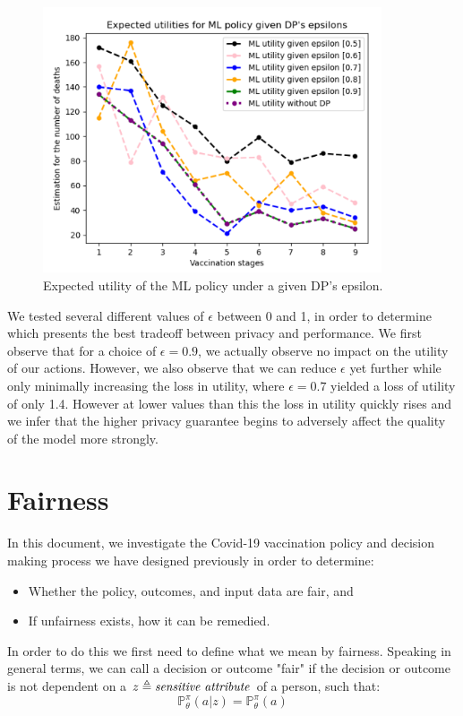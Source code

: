\documentclass{article}
\begin{document}
\begin{itemize}
\begin{figure}[H]
    \includegraphics[width=10cm]{pictures/epsilons.png}
    \centering
    \caption{Expected utility of the ML policy under a given DP's epsilon.}
    \label{fig: epsilons}
\end{figure}

We tested several different values of $\epsilon$ between 0 and 1, in order to determine which presents the best tradeoff between privacy and performance. We first observe that for a choice of $\epsilon = 0.9$, we actually observe no impact on the utility of our actions. However, we also observe that we can reduce $\epsilon$ yet further while only minimally increasing the loss in utility, where $\epsilon = 0.7$ yielded a loss of utility of only 1.4. However at lower values than this the loss in utility quickly rises and we infer that the higher privacy guarantee begins to adversely affect the quality of the model more strongly.
\end{itemize}

\section{Fairness}
\label{sec: Fairness}
In this document, we investigate the Covid-19 vaccination policy and decision making process we have designed previously in order to determine: 
\begin{itemize}
    \item Whether the policy, outcomes, and input data are fair, and 
    \item If unfairness exists, how it can be remedied. 
\end{itemize}

In order to do this we first need to define what we mean by fairness. Speaking in general terms, we can call a decision or outcome "fair" if the decision or outcome is not dependent on a $z \triangleq \text{\textit{sensitive attribute}}$ of a person, such that:
\begin{equation}
\label{eq: 1}
    \mathbb{P}_\theta^\pi(a|z) = \mathbb{P}_\theta^\pi(a)
\end{equation}
\end{document}
